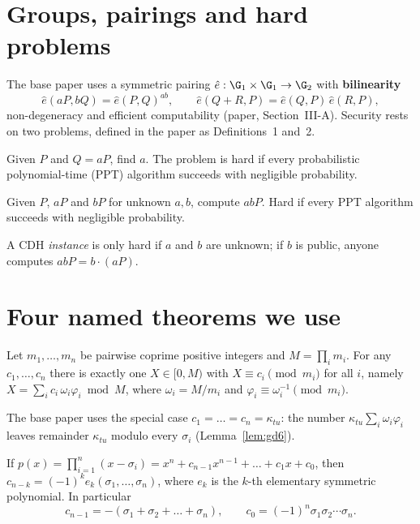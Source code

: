 \section{Groups, pairings and hard problems}
The base paper uses a symmetric pairing $\hat e:\G_1\times\G_1\to\G_2$ with \textbf{bilinearity}
\[
\hat e(aP,bQ)=\hat e(P,Q)^{ab},\qquad \hat e(Q+R,P)=\hat e(Q,P)\,\hat e(R,P),
\]
non-degeneracy and efficient computability (paper, Section~III-A). Security rests on two problems, defined in the paper as Definitions~1 and~2.

\begin{definition}[ECDLP]
Given $P$ and $Q=aP$, find $a$. The problem is hard if every probabilistic polynomial-time (PPT) algorithm succeeds with negligible probability.
\end{definition}
\begin{definition}[CDH]
Given $P$, $aP$ and $bP$ for unknown $a,b$, compute $abP$. Hard if every PPT algorithm succeeds with negligible probability.
\end{definition}
\noindent A CDH \emph{instance} is only hard if $a$ and $b$ are unknown; if $b$ is public, anyone computes $abP=b\cdot(aP)$.

\section{Four named theorems we use}
\begin{theorem}\label{thm:crt}
Let $m_1,\dots,m_n$ be pairwise coprime positive integers and $M=\prod_im_i$. For any $c_1,\dots,c_n$ there is exactly one $X\in[0,M)$ with
$X\equiv c_i\pmod{m_i}$ for all $i$, namely $X=\sum_i c_i\,\omega_i\varphi_i \bmod M$, where $\omega_i=M/m_i$ and $\varphi_i\equiv\omega_i^{-1}\pmod{m_i}$.
\end{theorem}
The base paper uses the special case $c_1=\dots=c_n=\kappa_{tu}$: the number $\kappa_{tu}\sum_i\omega_i\varphi_i$ leaves remainder $\kappa_{tu}$ modulo every
$\sigma_i$ (Lemma~\ref{lem:gd6}).

\begin{theorem}\label{thm:vieta}
If $p(x)=\prod_{i=1}^{n}(x-\sigma_i)=x^n+c_{n-1}x^{n-1}+\dots+c_1x+c_0$, then $c_{n-k}=(-1)^k e_k(\sigma_1,\dots,\sigma_n)$, where $e_k$ is the $k$-th
elementary symmetric polynomial. In particular
\[
c_{n-1}=-(\sigma_1+\sigma_2+\dots+\sigma_n),\qquad c_0=(-1)^n\sigma_1\sigma_2\cdots\sigma_n .
\]
\end{theorem}

